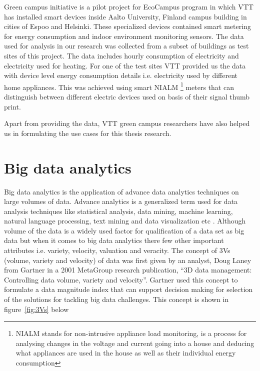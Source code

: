 Green campus initiative is a pilot project for EcoCampus program  in which VTT has installed smart devices inside Aalto University, Finland campus building in cities of Espoo and Helsinki. These specialized devices contained smart metering for energy consumption and indoor environment monitoring sensors.  The data used for analysis in our research was collected from a subset of buildings as test sites of this project. The data includes hourly consumption of electricity and electricity used for heating. For one of the test sites VTT provided us the data with device level energy consumption details i.e. electricity used by different home appliances. This was achieved using smart NIALM \footnote{ NIALM stands for non-intrusive appliance load monitoring,  is a process for analysing changes in the voltage and current going into a house and deducing what appliances are used in the house as well as their individual energy consumption }\cite{ hart1992nonintrusive} meters that can distinguish between different electric devices used on basis of their signal thumb print.

Apart from providing the data, VTT green campus researchers have also helped us in formulating the use cases for this thesis research.


\section{Big data analytics}

Big data analytics is the application of advance data analytics techniques on large volumes of data. Advance analytics is a generalized term used for data analysis techniques like statistical analysis, data mining, machine learning, natural language processing, text mining and data visualization etc \cite{russom2011big}. Although volume of the data is a widely used factor for qualification of a data set as big data but when it comes to big data analytics there few other important attributes i.e. variety, velocity, valuation and veracity. The concept of 3Vs (volume, variety and velocity) of data was first given by an analyst, Doug Laney from Gartner  in a 2001 MetaGroup research publication, ``3D data management: Controlling data volume, variety and velocity''\cite{laney20013d}.  Gartner used this concept to formulate a data magnitude index that can support decision making for selection of the solutions for tackling big data challenges. This concept is shown in figure~\ref{fig:3Vs} below

